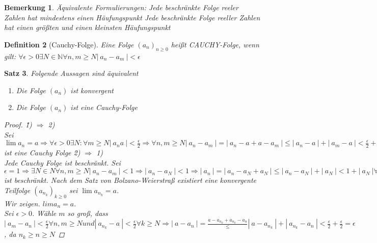 \documentclass[a4paper,titlepage,oneside]{article}
\def\N{\ensuremath{\mathbb{N}} }
\newcommand{\abs}[1]{\ensuremath{\left|\:#1\:\right|}}
\theoremstyle{thmstyle}
\newtheorem{satz}{Satz}[subsection]
\newtheorem{defi}[satz]{Definition}
\newtheorem{bem}[satz]{Bemerkung}
\begin{document}
\begin{bem}
Äquivalente Formulierungen:
Jede beschränkte Folge reeler Zahlen hat mindestens einen Häufungspunkt
Jede beschränkte Folge reeller Zahlen hat einen größten und einen kleinsten Häufungspunkt
\end{bem}

\begin{defi}[Cauchy-Folge] 
Eine Folge $(a_n)_{n \ge 0}$ heißt CAUCHY-Folge, wenn gilt:
$\forall \epsilon > 0 \exists N \in \N \forall n, m \ge N \abs{a_n - a_m} < \epsilon$
\end{defi}

\begin{satz}
Folgende Aussagen sind äquivalent
\begin{enumerate}
\item Die Folge $(a_n)$ ist konvergent
\item Die Folge $(a_n)$ ist eine Cauchy-Folge
\end{enumerate}
\begin{proof}
\"1) $\Rightarrow$ 2)\"\\
Sei $\lim{a_n} = a \Rightarrow \forall \epsilon > 0 \exists N : \forall m \ge N \abs{a_n a} < \frac{\epsilon}{2} \Rightarrow \forall n, m \ge N
\abs{a_n - a_m} = \abs{a_n - a + a - a_m} \le \abs{a_n - a }  + \abs{a_m - a} <  \frac{\epsilon}{2}+ \frac{\epsilon}{2} = \epsilon
\Rightarrow a_n$ ist eine Cauchy Folge
\"2) $\Rightarrow$ 1)\"\\
Jede Cauchy Folge ist beschränkt. Sei $\epsilon = 1 \Rightarrow \exists N \in N \forall n, m \ge N \abs{a_n - a_m} < 1 \Rightarrow \abs{a_n - a_N} < 1 \Rightarrow \abs{a_n} = \abs{a_n - a_N + a_N} \le \abs{a_n - a_N} + \abs{a_N} < 1 + \abs{a_N} \forall n  \ge N
\Rightarrow \forall n \in \N \abs{a_n} \le max\{\abs{a_0},...,\abs{a_{N-1}},\abs{a _N} + 1\} \Rightarrow (a_n)$ ist beschränkt.
Nach dem Satz von Bolzano-Weierstraß existiert eine konvergente Teilfolge $(a_{n_k})_{k \ge 0}$ sei $\lim{a_{n_k}} = a$.\\
Wir zeigen. $lim{a_n} = a.$\\
Sei $\epsilon > 0$. Wähle $m$ so groß, dass $\abs{a_m - a_n} < \frac{\epsilon}{2} \forall n,m \ge N und \abs{a_{n_k} - a} < \frac{\epsilon}{2} \forall k \ge N \Rightarrow \abs{a-a_n} = \frac{a - a_{n_k} + a_{n_k} - a_n} \le \abs{a- a_{n_k}} + \abs{a_{n_k} - a_n} < \frac{\epsilon}{2} + \frac{\epsilon}{2} = \epsilon$, da $n_k \ge n \ge N$
\end{proof}
\end{satz}
\end{document}
